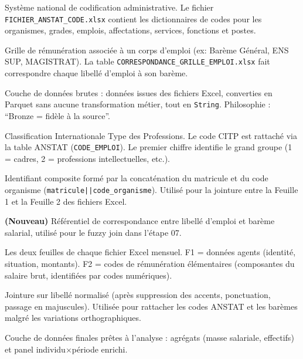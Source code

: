\documentclass[12pt,a4paper,french]{report}
\begin{document}
\begin{description}[leftmargin=3cm, labelwidth=2.8cm, style=nextline]

  \item[ANSTAT] Système national de codification administrative. Le fichier
  \texttt{FICHIER\_ANSTAT\_CODE.xlsx} contient les dictionnaires de codes pour
  les organismes, grades, emplois, affectations, services, fonctions et postes.

  \item[Barème salarial] Grille de rémunération associée à un corps d'emploi
  (ex: Barème Général, ENS SUP, MAGISTRAT). La table
  \texttt{CORRESPONDANCE\_GRILLE\_EMPLOI.xlsx} fait correspondre chaque libellé
  d'emploi à son barème.

  \item[Bronze] Couche de données brutes : données issues des fichiers Excel,
  converties en Parquet sans aucune transformation métier, tout en
  \texttt{String}. Philosophie : ``Bronze = fidèle à la source''.

  \item[CITP] Classification Internationale Type des Professions.
  Le code CITP est rattaché via la table ANSTAT (\texttt{CODE\_EMPLOI}).
  Le premier chiffre identifie le grand groupe (1 = cadres, 2 = professions
  intellectuelles, etc.).

  \item[CLE\_UNIQUE] Identifiant composite formé par la concaténation du
  matricule et du code organisme (\texttt{matricule||code\_organisme}).
  Utilisé pour la jointure entre la Feuille 1 et la Feuille 2 des fichiers
  Excel.

  \item[CORRESPONDANCE\_GRILLE\_EMPLOI.xlsx] \textbf{(Nouveau)} Référentiel
  de correspondance entre libellé d'emploi et barème salarial, utilisé pour
  le fuzzy join dans l'étape 07.

  \item[F1 / F2] Les deux feuilles de chaque fichier Excel mensuel.
  F1 = données agents (identité, situation, montants).
  F2 = codes de rémunération élémentaires (composantes du salaire brut,
  identifiées par codes numériques).

  \item[Fuzzy join] Jointure sur libellé normalisé (après suppression des
  accents, ponctuation, passage en majuscules). Utilisée pour rattacher les
  codes ANSTAT et les barèmes malgré les variations orthographiques.

  \item[Gold] Couche de données finales prêtes à l'analyse : agrégats
  (masse salariale, effectifs) et panel individu$\times$période enrichi.


\end{description}
\end{document}
